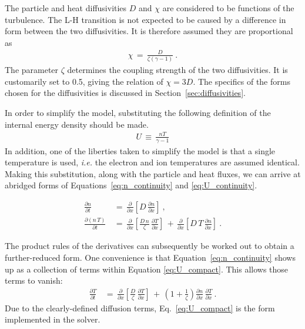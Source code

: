 The particle and heat diffusivities $D$ and $\chi$ are considered to be functions of the turbulence.
The L-H transition is not expected to be caused by a difference in form between the two diffusivities.
It is therefore assumed they are proportional as 
\begin{align} %
	\chi \,=\, \frac{D}{\zeta (\gamma - 1)} \label{eq:heat_particle_diff_relation}~.
\end{align}
The parameter $\zeta$ determines the coupling strength of the two diffusivities.
It is customarily set to 0.5, giving the relation of $\chi = 3 D$.
The specifics of the forms chosen for the diffusivities is discussed in Section~\ref{sec:diffusivities}.

In order to simplify the model, substituting the following definition of the internal energy density should be made.
\begin{align} %
	U \,\equiv\, \frac{n T}{\gamma - 1} \label{eq:U_definition}
\end{align}
In addition, one of the liberties taken to simplify the model is that a single temperature is used, \emph{i.e.} the electron and ion temperatures are assumed identical.
Making this substitution, along with the particle and heat fluxes, we can arrive at abridged forms of Equations~\ref{eq:n_continuity} and \ref{eq:U_continuity}.

\begin{align} %
	\frac{\partial n}{\partial t} \,&=\, \frac{\partial}{\partial x} \left[D \,
		\frac{\partial n}{\partial x}\right]~,\label{eq:n_compact} \\
	\frac{\partial(n\,T)}{\partial t} \,&=\, \frac{\partial}{\partial x}
		\left[\frac{D\,n}{\zeta} \, \frac{\partial T}{\partial x}\right]
		\,+\, \frac{\partial}{\partial x} \left[D\,T \,
		\frac{\partial n}{\partial x}\right]~. \label{eq:U_compact}
\end{align}

The product rules of the derivatives can subsequently be worked out to obtain a further-reduced form.
One convenience is that Equation~\ref{eq:n_continuity} shows up as a collection of terms within Equation \ref{eq:U_compact}.
This allows those terms to vanish:
\begin{align} %
	\frac{\partial T}{\partial t} \,&=\, \frac{\partial}{\partial x}
		\left[\frac{D}{\zeta} \, \frac{\partial T}{\partial x}\right] \,+\,
		\left(1 + \frac{1}{\zeta}\right) \frac{\partial n}{\partial x} \,
		\frac{\partial T}{\partial x}~. \label{eq:T_compact}
\end{align}
Due to the clearly-defined diffusion terms, Eq.~\ref{eq:U_compact} is the form implemented in the solver.

